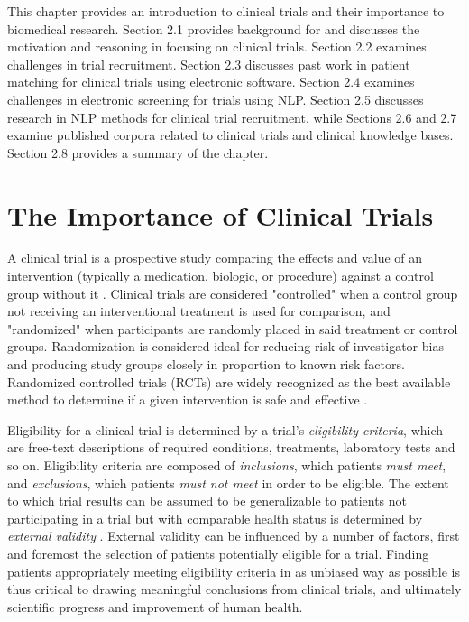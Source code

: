 \documentclass[../main.tex]{subfiles}
\begin{document}
This chapter provides an introduction to clinical trials and their importance to biomedical research. Section 2.1 provides background for and discusses the motivation and reasoning in focusing on clinical trials. Section 2.2 examines challenges in trial recruitment. Section 2.3 discusses past work in patient matching for clinical trials using electronic software. Section 2.4 examines challenges in electronic screening for trials using NLP. Section 2.5 discusses research in NLP methods for clinical trial recruitment, while Sections 2.6 and 2.7 examine published corpora related to clinical trials and clinical knowledge bases. Section 2.8 provides a summary of the chapter.

\section{The Importance of Clinical Trials}

A clinical trial is a prospective study comparing the effects and value of an intervention (typically a medication, biologic, or procedure) against a control group without it \cite{friedman2015fundamentals}. Clinical trials are considered "controlled" when a control group not receiving an interventional treatment is used for comparison, and "randomized" when participants are randomly placed in said treatment or control groups. Randomization is considered ideal for reducing risk of investigator bias and producing study groups closely in proportion to known risk factors. Randomized controlled trials (RCTs) are widely recognized as the best available method to determine if a given intervention is safe and effective \cite{friedman2015fundamentals}.

Eligibility for a clinical trial is determined by a trial's \textit{eligibility criteria}, which are free-text descriptions of required conditions, treatments, laboratory tests and so on. Eligibility criteria are composed of \textit{inclusions}, which patients \textit{must meet}, and \textit{exclusions}, which patients \textit{must not meet} in order to be eligible. The extent to which trial results can be assumed to be generalizable to patients not participating in a trial but with comparable health status is determined by \textit{external validity} \cite{rothwell2005external}. External validity can be influenced by a number of factors, first and foremost the selection of patients potentially eligible for a trial. Finding patients appropriately meeting eligibility criteria in as unbiased way as possible is thus critical to drawing meaningful conclusions from clinical trials, and ultimately scientific progress and improvement of human health.
\end{document}
